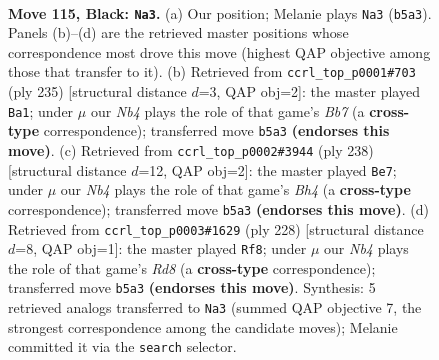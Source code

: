 \documentclass[11pt]{article}
\begin{document}
\clearpage

\begin{figure}[p]\centering
\begin{subfigure}{0.46\textwidth}\centering
\resizebox{\linewidth}{!}{%
\newchessgame
\chessboard[
  setfen={2B5/6k1/8/1n4PP/6K1/8/8/8 b - - 0 115},
  showmover=false,
  pgfstyle=straightmove, color=movearrow, markmove={b5-a3}
]}
\caption{}
\end{subfigure}\hfill
\begin{subfigure}{0.46\textwidth}\centering
\resizebox{\linewidth}{!}{%
\newchessgame
\chessboard[
  setfen={8/5k2/8/5PP1/6K1/8/1b2B3/8 b - - 86 118},
  showmover=false,
  pgfstyle=straightmove, color=movearrow, markmove={b2-a1}
]}
\caption{}
\end{subfigure}
\\[4pt]
\begin{subfigure}{0.46\textwidth}\centering
\resizebox{\linewidth}{!}{%
\newchessgame
\chessboard[
  setfen={8/1b6/8/7p/4kp1B/8/8/6K1 w - - 86 120},
  showmover=false,
  pgfstyle=straightmove, color=movearrow, markmove={h4-e7}
]}
\caption{}
\end{subfigure}\hfill
\begin{subfigure}{0.46\textwidth}\centering
\resizebox{\linewidth}{!}{%
\newchessgame
\chessboard[
  setfen={3R4/8/8/8/4b3/4kpp1/8/5K2 w - - 80 115},
  showmover=false,
  pgfstyle=straightmove, color=movearrow, markmove={d8-f8}
]}
\caption{}
\end{subfigure}
\caption{\textbf{Move 115, Black: \texttt{Na3}.} (a) Our position; Melanie plays \texttt{Na3} (\texttt{b5a3}). Panels (b)--(d) are the retrieved master positions whose correspondence most drove this move (highest QAP objective among those that transfer to it). (b) Retrieved from \texttt{ccrl\_top\_p0001\#703} (ply 235) [structural distance $d$=3, QAP obj=2]: the master played \texttt{Ba1}; under $\mu$ our \emph{Nb4} plays the role of that game's \emph{Bb7} (a \textbf{cross-type} correspondence); transferred move \texttt{b5a3} \textbf{(endorses this move)}. (c) Retrieved from \texttt{ccrl\_top\_p0002\#3944} (ply 238) [structural distance $d$=12, QAP obj=2]: the master played \texttt{Be7}; under $\mu$ our \emph{Nb4} plays the role of that game's \emph{Bh4} (a \textbf{cross-type} correspondence); transferred move \texttt{b5a3} \textbf{(endorses this move)}. (d) Retrieved from \texttt{ccrl\_top\_p0003\#1629} (ply 228) [structural distance $d$=8, QAP obj=1]: the master played \texttt{Rf8}; under $\mu$ our \emph{Nb4} plays the role of that game's \emph{Rd8} (a \textbf{cross-type} correspondence); transferred move \texttt{b5a3} \textbf{(endorses this move)}. Synthesis: 5 retrieved analogs transferred to \texttt{Na3} (summed QAP objective 7, the strongest correspondence among the candidate moves); Melanie committed it via the \texttt{search} selector.}
\label{fig:thought-m229}
\end{figure}
\end{document}
